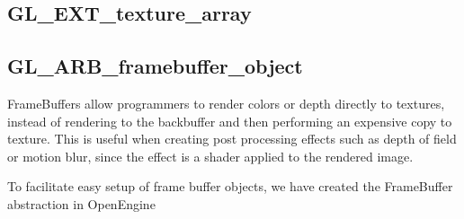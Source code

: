 \subsection{GL\_EXT\_texture\_array}


\subsection{GL\_ARB\_framebuffer\_object}

FrameBuffers allow programmers to render colors or depth directly to
textures, instead of rendering to the backbuffer and then performing
an expensive copy to texture. This is useful when creating post
processing effects such as depth of field or motion blur, since the
effect is a shader applied to the rendered image.


To facilitate easy setup of frame buffer objects, we have created the
FrameBuffer abstraction in OpenEngine



